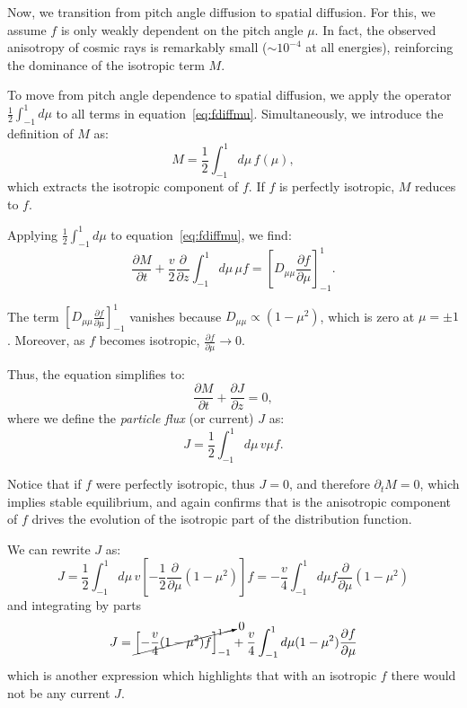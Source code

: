 Now, we transition from pitch angle diffusion to spatial diffusion. For this, we assume \( f \) is only weakly dependent on the pitch angle \( \mu \). In fact, the observed anisotropy of cosmic rays is remarkably small (\( \sim 10^{-4} \) at all energies), reinforcing the dominance of the isotropic term \( M \).

To move from pitch angle dependence to spatial diffusion, we apply the operator \( \frac{1}{2} \int_{-1}^1 d\mu \) to all terms in equation~\eqref{eq:fdiffmu}. Simultaneously, we introduce the definition of \( M \) as:
\begin{equation}
M = \frac{1}{2} \int_{-1}^1 d\mu \, f(\mu),
\end{equation}
which extracts the isotropic component of \( f \). If \( f \) is perfectly isotropic, \( M \) reduces to \( f \).

Applying \( \frac{1}{2} \int_{-1}^1 d\mu \) to equation~\eqref{eq:fdiffmu}, we find:
\begin{equation}
\frac{\partial M}{\partial t} + \frac{v}{2} \frac{\partial}{\partial z} \int_{-1}^1 d\mu \, \mu f = \left[ D_{\mu\mu} \frac{\partial f}{\partial \mu} \right]_{-1}^1.
\end{equation}

The term \( \left[ D_{\mu\mu} \frac{\partial f}{\partial \mu} \right]_{-1}^1 \) vanishes because \( D_{\mu\mu} \propto (1 - \mu^2) \), which is zero at \( \mu = \pm 1 \).
Moreover, as \( f \) becomes isotropic, \( \frac{\partial f}{\partial \mu} \to 0 \).

Thus, the equation simplifies to:
\begin{equation}\label{eq:MtJz}
\frac{\partial M}{\partial t} + \frac{\partial J}{\partial z} = 0,
\end{equation}
where we define the \emph{particle flux} (or current) \( J \) as:
\begin{equation}\label{eq:jdef}
J = \frac{1}{2} \int_{-1}^1 d\mu \, v \mu f.
\end{equation}

Notice that if \( f \) were perfectly isotropic, thus \( J = 0 \), and therefore \( \partial_t M = 0 \), which implies stable equilibrium, and again confirms that is the anisotropic component of \( f \) drives the evolution of the isotropic part of the distribution function.

We can rewrite \( J \) as:
\begin{equation}
J = \frac{1}{2} \int_{-1}^1 d\mu \, v \left[ -\frac{1}{2} \frac{\partial}{\partial \mu} (1-\mu^2) \right] f = - \frac{v}{4} \int_{-1}^1 d\mu f \frac{\partial}{\partial \mu} (1 - \mu^2)
\end{equation}
and integrating by parts
\begin{equation}
J = \cancelto{0}{\left[ -\frac{v}{4} (1-\mu^2) f \right]_{-1}^{1}} + \frac{v}{4} \int_{-1}^1 d\mu (1 - \mu^2) \frac{\partial f}{\partial \mu}
\end{equation}
%
which is another expression which highlights that with an isotropic \( f \) there would not be any current \( J \).

